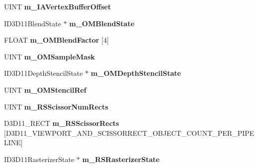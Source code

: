 \begin{DoxyCompactItemize}
\item 
\hypertarget{struct_c_state11_ac2795e3e2e69050319a91a67e3b6c7b2}{U\+I\+N\+T {\bfseries m\+\_\+\+I\+A\+Vertex\+Buffer\+Offset}}\label{struct_c_state11_ac2795e3e2e69050319a91a67e3b6c7b2}

\item 
\hypertarget{struct_c_state11_a2d3705658d165823d4dcc3cbdd004bd1}{I\+D3\+D11\+Blend\+State $\ast$ {\bfseries m\+\_\+\+O\+M\+Blend\+State}}\label{struct_c_state11_a2d3705658d165823d4dcc3cbdd004bd1}

\item 
\hypertarget{struct_c_state11_a6493ce8c57783de24637f58f576d3033}{F\+L\+O\+A\+T {\bfseries m\+\_\+\+O\+M\+Blend\+Factor} \mbox{[}4\mbox{]}}\label{struct_c_state11_a6493ce8c57783de24637f58f576d3033}

\item 
\hypertarget{struct_c_state11_ae69e3daf0bb491eb44b16f0b4c2a7266}{U\+I\+N\+T {\bfseries m\+\_\+\+O\+M\+Sample\+Mask}}\label{struct_c_state11_ae69e3daf0bb491eb44b16f0b4c2a7266}

\item 
\hypertarget{struct_c_state11_a25f3387f855d828f67249c1b95b123e7}{I\+D3\+D11\+Depth\+Stencil\+State $\ast$ {\bfseries m\+\_\+\+O\+M\+Depth\+Stencil\+State}}\label{struct_c_state11_a25f3387f855d828f67249c1b95b123e7}

\item 
\hypertarget{struct_c_state11_abb8eec40c5831abba60f5b71e7f9cda2}{U\+I\+N\+T {\bfseries m\+\_\+\+O\+M\+Stencil\+Ref}}\label{struct_c_state11_abb8eec40c5831abba60f5b71e7f9cda2}

\item 
\hypertarget{struct_c_state11_aa46394867815818a9c2db1ad90850c51}{U\+I\+N\+T {\bfseries m\+\_\+\+R\+S\+Scissor\+Num\+Rects}}\label{struct_c_state11_aa46394867815818a9c2db1ad90850c51}

\item 
\hypertarget{struct_c_state11_a0aa705779bc6c0da5e315dd21566a4b2}{D3\+D11\+\_\+\+R\+E\+C\+T {\bfseries m\+\_\+\+R\+S\+Scissor\+Rects} \mbox{[}D3\+D11\+\_\+\+V\+I\+E\+W\+P\+O\+R\+T\+\_\+\+A\+N\+D\+\_\+\+S\+C\+I\+S\+S\+O\+R\+R\+E\+C\+T\+\_\+\+O\+B\+J\+E\+C\+T\+\_\+\+C\+O\+U\+N\+T\+\_\+\+P\+E\+R\+\_\+\+P\+I\+P\+E\+L\+I\+N\+E\mbox{]}}\label{struct_c_state11_a0aa705779bc6c0da5e315dd21566a4b2}

\item 
\hypertarget{struct_c_state11_a5bb420cc61aecdc7405e2b338a81644d}{I\+D3\+D11\+Rasterizer\+State $\ast$ {\bfseries m\+\_\+\+R\+S\+Rasterizer\+State}}\label{struct_c_state11_a5bb420cc61aecdc7405e2b338a81644d}


\end{DoxyCompactItemize}
